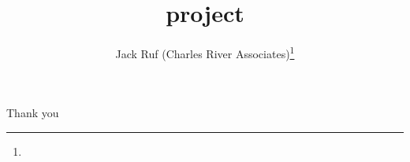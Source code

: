 \documentclass[11pt,notes=hide,aspectratio=169,mathserif]{beamer}
\title[project]{project}
\author[Ruf et. al.]{Jack Ruf (Charles River Associates)\thanks{\rufemail}}
\date{\monthname[\the\month] \the\year}
\begin{document}
\begin{frame}[plain]
\titlepage
\note{
	\begin{itemize}
	\end{itemize}
}
\end{frame}
%

\begin{frame}[plain]
\begin{center}{\LARGE Thank you}\end{center}
\end{frame}


\appendix
%

%
\end{document}
